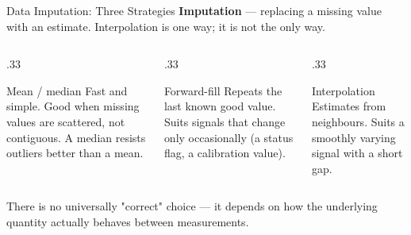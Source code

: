 \documentclass[9pt,aspectratio=169,xcolor=table]{beamer}
\begin{document}
\begin{frame}{Data Imputation: Three Strategies}
    \leavevmode
    \small
    \textbf{Imputation} --- replacing a missing value with an estimate.
    Interpolation is one way; it is not the only way.

    \vspace{2mm}
    \begin{columns}[t]
        \begin{column}{.33\textwidth}
            \begin{block}{Mean / median}
                \scriptsize Fast and simple. Good when missing values
                are scattered, not contiguous. A median resists
                outliers better than a mean.
            \end{block}
        \end{column}
        \begin{column}{.33\textwidth}
            \begin{block}{Forward-fill}
                \scriptsize Repeats the last known good value.
                Suits signals that change only occasionally (a status
                flag, a calibration value).
            \end{block}
        \end{column}
        \begin{column}{.33\textwidth}
            \begin{block}{Interpolation}
                \scriptsize Estimates from neighbours. Suits a
                smoothly varying signal with a short gap.
            \end{block}
        \end{column}
    \end{columns}

    \vspace{3mm}
    {\small There is no universally "correct" choice --- it depends on
    how the underlying quantity actually behaves between
    measurements.}
\end{frame}
\end{document}
